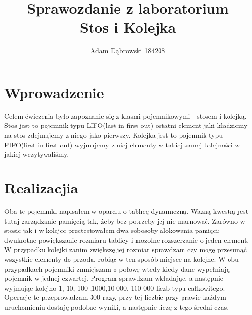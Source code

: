 \documentclass[a4paper,11pt]{report}
\title{\textbf{Sprawozdanie z laboratorium\\Stos i Kolejka}}
\author{Adam Dąbrowski 184208}
\begin{document}
\maketitle
\chapter{Wprowadzenie}

Celem ćwiczenia było zapoznanie się z klasmi pojemnikowymi - stosem i kolejką. Stos jest to pojemnik typu LIFO(last in first out) ostatni element jaki kładziemy na stos zdejmujemy z niego jako pierwszy. Kolejka jest to pojemnik typu FIFO(first in first out) wyjmujemy z niej elementy w takiej samej kolejności w jakiej wczytywaliśmy.  

\chapter{Realizacjia}

Oba te pojemniki napisałem w oparciu o tablicę dynamiczną. Ważną kwestią jest tutaj zarządzanie pamięcią tak, żeby bez potrzeby jej nie marnować. 
Zarówno w stosie jak i w kolejce przetestowałem dwa sobosoby alokowania pamięci: dwukrotne powiększanie rozmiaru tablicy i mozolne rozszerzanie o jeden element. W przypadku kolejki zanim zwiększę jej rozmiar sprawdzam czy mogę przesunąć wszystkie elementy do przodu, robiąc w ten sposób miejsce na kolejne. W obu przypadkach pojemniki zmniejszam o połowę wtedy kiedy dane wypełniają pojemnik w jednej czwartej. Program sprawdzam wkładając, a następnie wyjmując kolejno 1, 10, 100 ,1000,10 000, 100 000 liczb typu całkowitego. Operacje te przeprowadzam 300 razy, przy tej liczbie przy prawie każdym uruchomieniu dostaję podobne wyniki, a następnie liczę z tego średni czas. 
\newpage
\end{document}
